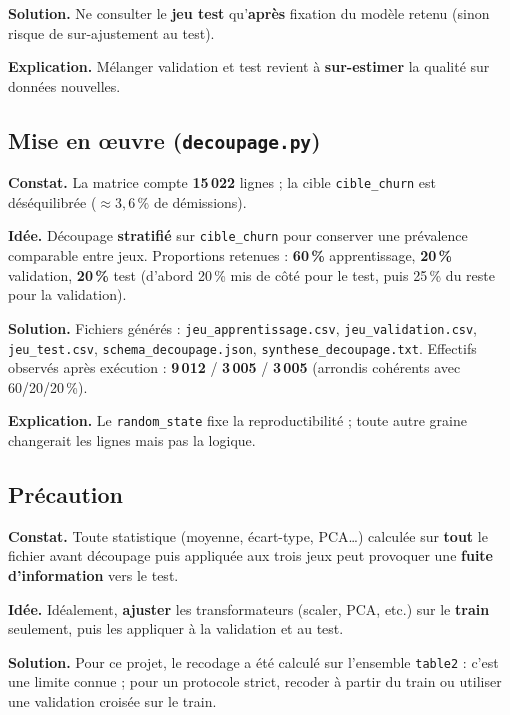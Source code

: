 \documentclass[11pt,a4paper]{article}
\begin{document}
\textbf{Solution.} Ne consulter le \textbf{jeu test} qu'\textbf{après} fixation du modèle retenu (sinon risque de sur-ajustement au test).

\textbf{Explication.} Mélanger validation et test revient à \textbf{sur-estimer} la qualité sur données nouvelles.

\subsection{Mise en œuvre (\texttt{decoupage.py})}

\textbf{Constat.} La matrice compte \textbf{15\,022} lignes ; la cible \texttt{cible\_churn} est déséquilibrée ($\approx 3{,}6\,\%$ de démissions).

\textbf{Idée.} Découpage \textbf{stratifié} sur \texttt{cible\_churn} pour conserver une prévalence comparable entre jeux. Proportions retenues : \textbf{60\,\%} apprentissage, \textbf{20\,\%} validation, \textbf{20\,\%} test (d'abord 20\,\% mis de côté pour le test, puis 25\,\% du reste pour la validation).

\textbf{Solution.} Fichiers générés : \texttt{jeu\_apprentissage.csv}, \texttt{jeu\_validation.csv}, \texttt{jeu\_test.csv}, \texttt{schema\_decoupage.json}, \texttt{synthese\_decoupage.txt}. Effectifs observés après exécution : \textbf{9\,012} / \textbf{3\,005} / \textbf{3\,005} (arrondis cohérents avec 60/20/20\,\%).

\textbf{Explication.} Le \texttt{random\_state} fixe la reproductibilité ; toute autre graine changerait les lignes mais pas la logique.

\subsection{Précaution}

\textbf{Constat.} Toute statistique (moyenne, écart-type, PCA\ldots) calculée sur \textbf{tout} le fichier avant découpage puis appliquée aux trois jeux peut provoquer une \textbf{fuite d'information} vers le test.

\textbf{Idée.} Idéalement, \textbf{ajuster} les transformateurs (scaler, PCA, etc.) sur le \textbf{train} seulement, puis les appliquer à la validation et au test.

\textbf{Solution.} Pour ce projet, le recodage a été calculé sur l'ensemble \texttt{table2} : c'est une limite connue ; pour un protocole strict, recoder à partir du train ou utiliser une validation croisée sur le train.
\end{document}
